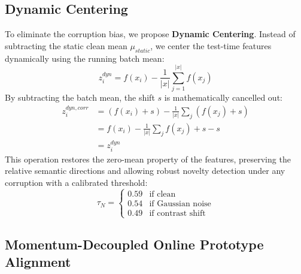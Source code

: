\documentclass{article}
\theoremstyle{plain}
\theoremstyle{definition}
\theoremstyle{remark}
\begin{document}
\subsection{Dynamic Centering}
To eliminate the corruption bias, we propose \textbf{Dynamic Centering}. Instead of subtracting the static clean mean $\mu_{static}$, we center the test-time features dynamically using the running batch mean:
\begin{equation}
    z^{dyn}_i = f(x_i) - \frac{1}{|x|} \sum_{j=1}^{|x|} f(x_j)
\end{equation}
By subtracting the batch mean, the shift $s$ is mathematically cancelled out:
\begin{align}
    z^{dyn, corr}_i &= (f(x_i)+s) - \frac{1}{|x|} \sum_j (f(x_j)+s) \nonumber \\
    &= f(x_i) - \frac{1}{|x|} \sum_j f(x_j) + s - s \nonumber \\
    &= z^{dyn}_i
\end{align}
This operation restores the zero-mean property of the features, preserving the relative semantic directions and allowing robust novelty detection under any corruption with a calibrated threshold:
\begin{equation}
    \tau_N = \begin{cases}
        0.59 & \text{if clean} \\
        0.54 & \text{if Gaussian noise} \\
        0.49 & \text{if contrast shift}
    \end{cases}
\end{equation}

\subsection{Momentum-Decoupled Online Prototype Alignment}
\label{subsec:md-opa-details}
\end{document}
